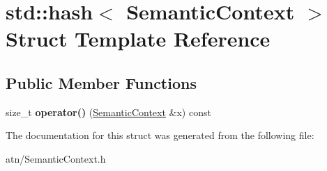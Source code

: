 \hypertarget{structstd_1_1hash_3_01SemanticContext_01_4}{}\section{std\+:\+:hash$<$ Semantic\+Context $>$ Struct Template Reference}
\label{structstd_1_1hash_3_01SemanticContext_01_4}
\subsection*{Public Member Functions}
\begin{DoxyCompactItemize}
\item 
\mbox{\label{structstd_1_1hash_3_01SemanticContext_01_4_ae43aa63e72b61f77cdb980ce52a8d02e}} 
size\+\_\+t {\bfseries operator()} (\hyperlink{classantlr4_1_1atn_1_1SemanticContext}{Semantic\+Context} \&x) const
\end{DoxyCompactItemize}


The documentation for this struct was generated from the following file\+:\begin{DoxyCompactItemize}
\item 
atn/Semantic\+Context.\+h\end{DoxyCompactItemize}
